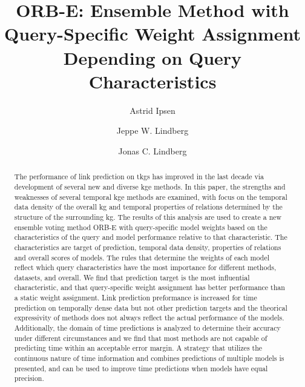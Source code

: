 \documentclass[sigconf,screen,nonacm=true]{acm_files/acmart}
\begin{document}

\setcounter{page}{1}
\fancyfoot[C]{\thepage/\pageref*{TotPages}}
\title{
ORB-E: Ensemble Method with Query-Specific Weight Assignment Depending on Query Characteristics
}
\renewcommand{\footskip}{16mm}

\author{Astrid Ipsen}

\author{Jeppe W. Lindberg}

\author{Jonas C. Lindberg}

\begin{abstract}
The performance of link prediction on \glspl{tkg} has improved in the last decade via development of several new and diverse \gls{kge} methods.
In this paper, the strengths and weaknesses of several temporal \gls{kge} methods are examined, with focus on the temporal data density of the overall \gls{kg} and temporal properties of relations determined by the structure of the surrounding \gls{kg}.
The results of this analysis are used to create a new ensemble voting method ORB-E with query-specific model weights based on the characteristics of the query and model performance relative to that characteristic.
The characteristics are target of prediction, temporal data density, properties of relations and overall scores of models.
The rules that determine the weights of each model reflect which query characteristics have the most importance for different methods, datasets, and overall.
We find that prediction target is the most influential characteristic, and that query-specific weight assignment has better performance than a static weight assignment.
Link prediction preformance is increased for time prediction on temporally dense data but not other prediction targets and the theorical expressivity of methods does not always reflect the actual performance of the models.
Additionally, the domain of time predictions is analyzed to determine their accuracy under different circumstances and we find that most methods are not capable of predicting time within an acceptable error margin.
A strategy that utilizes the continuous nature of time information and combines predictions of multiple models is presented, and can be used to improve time predictions when models have equal precision.
\end{abstract}
\end{document}
